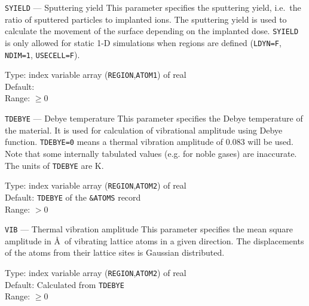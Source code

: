 \begin{keydescription}{\texttt{SYIELD} --- Sputtering yield}
%
  This parameter specifies the sputtering yield, i.e.\ the ratio of
  sputtered particles to implanted ions.  The sputtering yield is used
  to calculate the movement of the surface depending on the implanted
  dose. \texttt{SYIELD} is only allowed for static 1-D simulations when
  regions are defined (\texttt{LDYN=F}, \texttt{NDIM=1}, \texttt{USECELL=F}).
%
  \begin{keytab}
    Type:    \> index variable array (\texttt{REGION},\texttt{ATOM1}) 
                of real \\
    Default:  \\
    Range:   \> $\ge 0$
  \end{keytab}
\end{keydescription}

\begin{keydescription}{\texttt{TDEBYE} --- Debye temperature}
%
  This parameter specifies the Debye temperature of the material. It is used
  for calculation of vibrational amplitude using Debye function.  
  \texttt{TDEBYE=0} means a thermal vibration amplitude of 0.083 will be used. 
  Note that some internally tabulated values (e.g. for noble gases) are
  inaccurate. The units of \texttt{TDEBYE} are K.
%
  \begin{keytab}
    Type:    \> index variable array (\texttt{REGION},\texttt{ATOM2}) 
                of real \\
    Default: \> \texttt{TDEBYE} of the \texttt{\&ATOMS} record \\
    Range:   \> $> 0$
  \end{keytab}
\end{keydescription}

\begin{keydescription}{\texttt{VIB} --- Thermal vibration amplitude}
%
  This parameter specifies the mean square amplitude in \AA ~of
  vibrating lattice atoms in a given direction. The displacements of
  the atoms from their lattice sites is Gaussian distributed.
%
  \begin{keytab}
    Type:    \> index variable array (\texttt{REGION},\texttt{ATOM2}) 
                of real \\
    Default: \> Calculated from \texttt{TDEBYE} \\
    Range:   \> $\ge 0$
  \end{keytab}
\end{keydescription}


